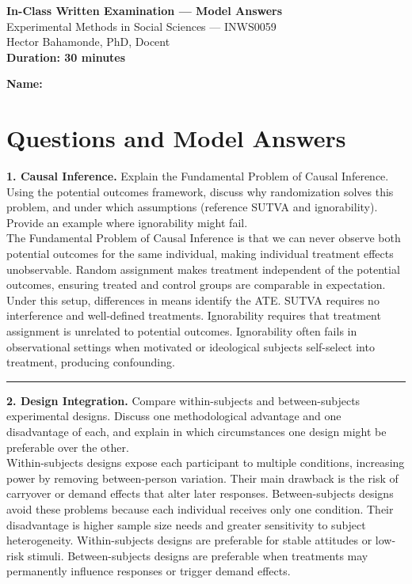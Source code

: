 \documentclass[12pt]{article}
\newcommand{\pts}[1]{\todo[color=blue!20,size=\tiny]{#1 pts}}
\begin{document}
\begin{center}
    {\Large \textbf{In-Class Written Examination --- Model Answers}}\\[4pt]
    {\large Experimental Methods in Social Sciences --- INWS0059}\\[2pt]
    {\large Hector Bahamonde, PhD, Docent}\\[10pt]
    {\large \textbf{Duration: 30 minutes}}\\[6pt]
\end{center}

\vspace{0.2cm}

\textbf{Name:} \hrulefill

\vspace{0.2cm}

\vspace{0.3cm}

\section*{Questions and Model Answers}

\textbf{1. Causal Inference.} Explain the Fundamental Problem of Causal Inference. Using the potential outcomes framework, discuss why randomization solves this problem, and under which assumptions (reference SUTVA and ignorability). Provide an example where ignorability might fail.\\[0.2cm]
\pts{2} The Fundamental Problem of Causal Inference is that we can never observe both potential outcomes for the same individual, making individual treatment effects unobservable. \pts{2} Random assignment makes treatment independent of the potential outcomes, ensuring treated and control groups are comparable in expectation. \pts{2} Under this setup, differences in means identify the ATE. \pts{2} SUTVA requires no interference and well-defined treatments. \pts{2} Ignorability requires that treatment assignment is unrelated to potential outcomes. \pts{2} Ignorability often fails in observational settings when motivated or ideological subjects self-select into treatment, producing confounding.


\vspace{0.5cm}\hrule\vspace{0.4cm}

\textbf{2. Design Integration.} Compare within-subjects and between-subjects experimental designs. Discuss one methodological advantage and one disadvantage of each, and explain in which circumstances one design might be preferable over the other.\\[0.2cm]
\pts{2} Within-subjects designs expose each participant to multiple conditions, increasing power by removing between-person variation. \pts{2} Their main drawback is the risk of carryover or demand effects that alter later responses. \pts{2} Between-subjects designs avoid these problems because each individual receives only one condition. \pts{2} Their disadvantage is higher sample size needs and greater sensitivity to subject heterogeneity. \pts{2} Within-subjects designs are preferable for stable attitudes or low-risk stimuli. \pts{2} Between-subjects designs are preferable when treatments may permanently influence responses or trigger demand effects.
\end{document}

